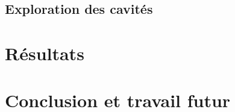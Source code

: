\subsection{Exploration des cavités}




\section{Résultats} \label{sec:ugv_results}

\section{Conclusion et travail futur}
